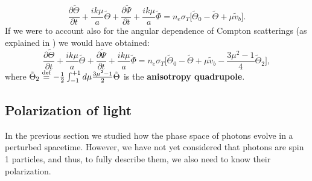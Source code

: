 \begin{equation*}
    \frac{\partial \tilde\Theta}{\partial t} +\frac{ik\mu}{a}\tilde\Theta+\frac{\partial \tilde\Psi}{\partial t}+\frac{ik\mu}{a}\tilde\Phi=n_e \sigma_T\Bigg[\tilde\Theta_0-\tilde\Theta+\mu\tilde v_b\Bigg].
\end{equation*}
If we were to account also for the angular dependence of Compton scatterings (as explained in \cite{dodelson}) we would have obtained:
\begin{equation}
    \frac{\partial \tilde\Theta}{\partial t} +\frac{ik\mu}{a}\tilde\Theta+\frac{\partial \tilde\Psi}{\partial t}+\frac{ik\mu}{a}\tilde\Phi=n_e \sigma_T\Bigg[\tilde\Theta_0-\tilde\Theta+\mu\tilde v_b-\frac{3\mu^2-1}{4}\tilde\Theta_2\Bigg],
\end{equation}
where $\tilde\Theta_2\stackrel{\text{def}}{=} -\frac{1}{2}\int_{-1}^{+1}d\mu\frac{3\mu^2-1}{2}\tilde\Theta$ is the \textbf{anisotropy quadrupole}.
\subsection{Polarization of light}\label{sec:PhotonsPolarization}
In the previous section we studied how the phase space of photons evolve in a perturbed spacetime. However, we have not yet considered that photons are spin 1 particles, and thus, to fully describe them, we also need to know their polarization.

